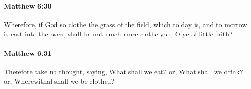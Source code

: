		\paragraph{Matthew 6:30} %
			\label{MATTHEW-6-30}

			Wherefore, if God so clothe the grass of the field, which to day is, and to morrow is cast into the oven, shall he not much more clothe you, O ye of little faith?

			\begin{framed}
			\scriptsize
				\begin{compactdesc}
					\item[SBLG] 
				\end{compactdesc}
			\end{framed}

		\paragraph{Matthew 6:31} %
			\label{MATTHEW-6-31}

			Therefore take no thought, saying, What shall we eat? or, What shall we drink? or, Wherewithal shall we be clothed?

